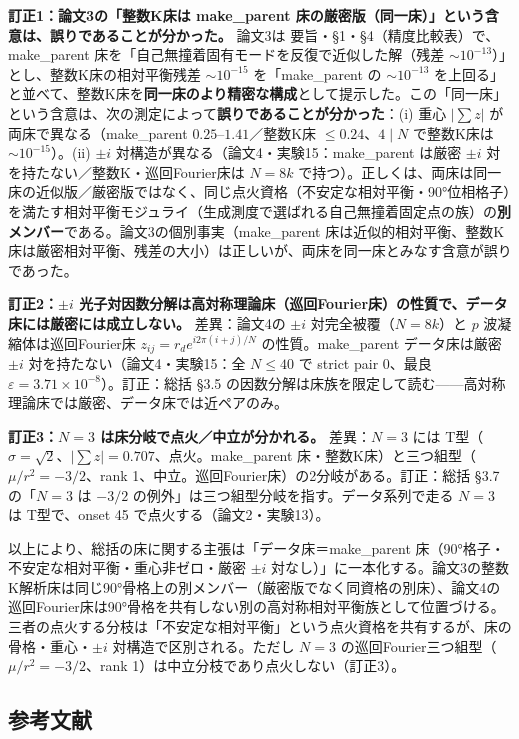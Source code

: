 \documentclass[
  a4paper,
]{ltjsarticle}
\begin{document}
\textbf{訂正1：論文3の「整数K床は make\_parent
床の厳密版（同一床）」という含意は、誤りであることが分かった。} 論文3は
要旨・§1・§4（精度比較表）で、make\_parent
床を「自己無撞着固有モードを反復で近似した解（残差
\(\sim10^{-13}\)）」とし、整数K床の相対平衡残差 \(\sim10^{-15}\)
を「make\_parent の \(\sim10^{-13}\)
を上回る」と並べて、整数K床を\textbf{同一床のより精密な構成}として提示した。この「同一床」という含意は、次の測定によって\textbf{誤りであることが分かった}：(i)
重心 \(|\sum z|\) が両床で異なる（make\_parent
\(0.25\)--\(1.41\)／整数K床 \(\le0.24\)、\(4\mid N\) で整数K床は
\(\sim10^{-15}\)）。(ii) \(\pm i\)
対構造が異なる（論文4・実験15：make\_parent は厳密 \(\pm i\)
対を持たない／整数K・巡回Fourier床は \(N=8k\)
で持つ）。正しくは、両床は同一床の近似版／厳密版ではなく、同じ点火資格（不安定な相対平衡・90°位相格子）を満たす相対平衡モジュライ（生成測度で選ばれる自己無撞着固定点の族）の\textbf{別メンバー}である。論文3の個別事実（make\_parent
床は近似的相対平衡、整数K床は厳密相対平衡、残差の大小）は正しいが、両床を同一床とみなす含意が誤りであった。

\textbf{訂正2：\(\pm i\)
光子対因数分解は高対称理論床（巡回Fourier床）の性質で、データ床には厳密には成立しない。}
差異：論文4の \(\pm i\) 対完全被覆（\(N=8k\)）と \(p\)
波凝縮体は巡回Fourier床 \(z_{ij}=r_d e^{i2\pi(i+j)/N}\)
の性質。make\_parent データ床は厳密 \(\pm i\)
対を持たない（論文4・実験15：全 \(N\le40\) で strict pair 0、最良
\(\varepsilon=3.71\times10^{-8}\)）。訂正：総括 §3.5
の因数分解は床族を限定して読む------高対称理論床では厳密、データ床では近ペアのみ。

\textbf{訂正3：\(N=3\) は床分岐で点火／中立が分かれる。} 差異：\(N=3\)
には T型（\(\sigma=\sqrt2\)、\(|\sum z|=0.707\)、点火。make\_parent
床・整数K床）と三つ組型（\(\mu/r^2=-3/2\)、rank
1、中立。巡回Fourier床）の2分岐がある。訂正：総括 §3.7 の「\(N=3\) は
\(-3/2\) の例外」は三つ組型分岐を指す。データ系列で走る \(N=3\) は
T型で、onset 45 で点火する（論文2・実験13）。

以上により、総括の床に関する主張は「データ床＝make\_parent
床（90°格子・不安定な相対平衡・重心非ゼロ・厳密 \(\pm i\)
対なし）」に一本化する。論文3の整数K解析床は同じ90°骨格上の別メンバー（厳密版でなく同資格の別床）、論文4の巡回Fourier床は90°骨格を共有しない別の高対称相対平衡族として位置づける。三者の点火する分枝は「不安定な相対平衡」という点火資格を共有するが、床の骨格・重心・\(\pm i\)
対構造で区別される。ただし \(N=3\)
の巡回Fourier三つ組型（\(\mu/r^2=-3/2\)、rank
1）は中立分枝であり点火しない（訂正3）。

\subsection{参考文献}\label{ux53c2ux8003ux6587ux732e}
\end{document}
